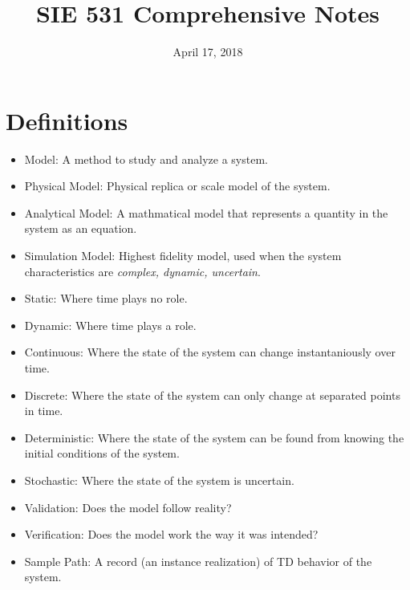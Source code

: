 \documentclass[12pt]{article}
\begin{document}
\title{SIE 531 Comprehensive Notes}
\date{April 17, 2018}
\maketitle

\section*{Definitions}

\begin{itemize}

\item Model: A method to study and analyze a system.

\item Physical Model: Physical replica or scale model of the system. 

\item Analytical Model: A mathmatical model that represents a quantity in the system as an equation.

\item Simulation Model: Highest fidelity model, used when the system characteristics are \emph{complex, dynamic, uncertain}.

\item Static: Where time plays no role.

\item Dynamic: Where time plays a role. 

\item Continuous: Where the state of the system can change instantaniously over time.

\item Discrete: Where the state of the system can only change at separated points in time.

\item Deterministic: Where the state of the system can be found from knowing the initial conditions of the system.

\item Stochastic: Where the state of the system is uncertain. 

\item Validation: Does the model follow reality?

\item Verification: Does the model work the way it was intended? 

\item Sample Path: A record (an instance realization) of TD behavior of the system.


\end{itemize}
\end{document}

